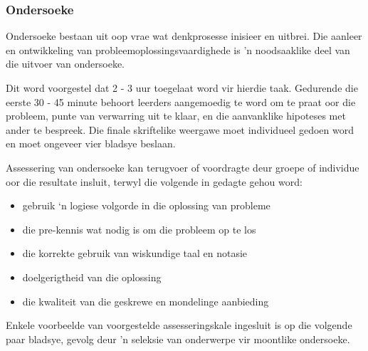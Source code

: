\subsubsection{Ondersoeke}
Ondersoeke bestaan uit oop vrae wat denkprosesse inisieer en uitbrei. Die aanleer en ontwikkeling van probleemoplossingsvaardighede is 'n noodsaaklike deel van die uitvoer van ondersoeke.\par
Dit word voorgestel dat 2 - 3 uur toegelaat word vir hierdie taak. Gedurende die eerste 30 - 45 minute behoort leerders aangemoedig te word om te praat oor die probleem, punte van verwarring uit te klaar, en die aanvanklike hipoteses met ander te bespreek. Die finale skriftelike weergawe moet individueel gedoen word en moet ongeveer vier bladsye beslaan.\par

Assessering van ondersoeke kan terugvoer of voordragte deur groepe of individue oor die resultate insluit, terwyl die volgende in gedagte gehou word:
\begin{itemize}[noitemsep]
\item
   gebruik ‘n logiese volgorde in die oplossing van probleme
\item
   die pre-kennis wat nodig is om die probleem op te los
\item
  die korrekte gebruik van wiskundige taal en notasie
\item
  doelgerigtheid van die oplossing
\item
  die kwaliteit van die geskrewe en mondelinge aanbieding
\end{itemize}
Enkele voorbeelde van voorgestelde assesseringskale ingesluit is op die volgende paar bladsye, gevolg deur 'n seleksie van onderwerpe vir moontlike ondersoeke.

